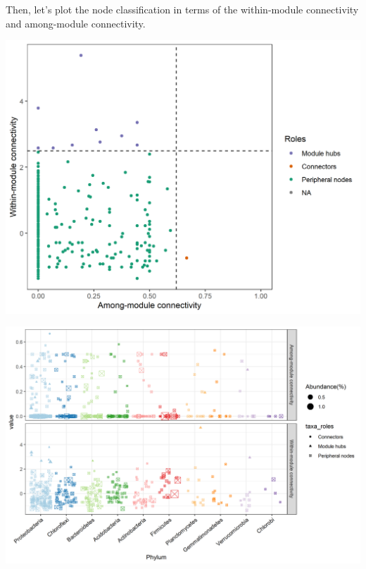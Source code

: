\documentclass[
]{book}
\newenvironment{Shaded}{\begin{snugshade}}{\end{snugshade}}
\newcommand{\AttributeTok}[1]{\textcolor[rgb]{0.77,0.63,0.00}{#1}}
\newcommand{\CommentTok}[1]{\textcolor[rgb]{0.56,0.35,0.01}{\textit{#1}}}
\newcommand{\DecValTok}[1]{\textcolor[rgb]{0.00,0.00,0.81}{#1}}
\newcommand{\FunctionTok}[1]{\textcolor[rgb]{0.00,0.00,0.00}{#1}}
\newcommand{\NormalTok}[1]{#1}
\newcommand{\SpecialCharTok}[1]{\textcolor[rgb]{0.00,0.00,0.00}{#1}}
\begin{document}
Then, let's plot the node classification in terms of the within-module connectivity and among-module connectivity.

\begin{Shaded}
\end{Shaded}

\begin{center}\includegraphics[width=700px]{Images/plot_taxa_roles} \end{center}

\begin{Shaded}
\end{Shaded}

\begin{center}\includegraphics[width=800px]{Images/plot_taxa_roles_2} \end{center}
\end{document}

